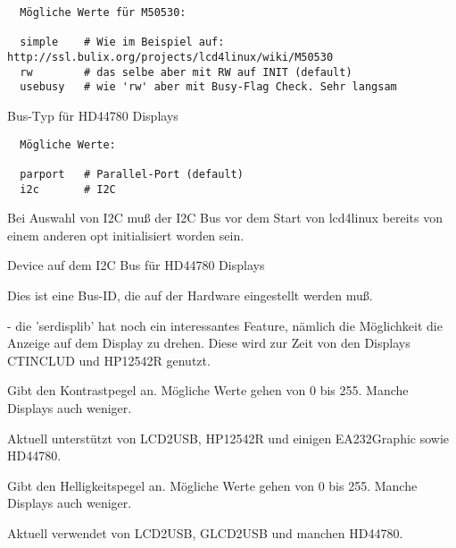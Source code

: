 \begin{description}
\begin{example}
\begin{verbatim}
  Mögliche Werte für M50530:

  simple	# Wie im Beispiel auf: http://ssl.bulix.org/projects/lcd4linux/wiki/M50530
  rw		# das selbe aber mit RW auf INIT (default)
  usebusy	# wie 'rw' aber mit Busy-Flag Check. Sehr langsam
\end{verbatim}
\end{example}


  Bus-Typ für HD44780 Displays
  
\begin{example}
\begin{verbatim}
  Mögliche Werte:

  parport	# Parallel-Port (default)
  i2c		# I2C
\end{verbatim}
\end{example}

  Bei Auswahl von I2C muß der I2C Bus vor dem Start von lcd4linux bereits von einem anderen opt initialisiert worden sein.


  Device auf dem I2C Bus für HD44780 Displays

  Dies ist eine Bus-ID, die auf der Hardware eingestellt werden muß.


  - die 'serdisplib' hat noch ein interessantes Feature, nämlich die Möglichkeit
  die Anzeige auf dem Display zu drehen.
  Diese wird zur Zeit von den Displays CTINCLUD und HP12542R genutzt.


  Gibt den Kontrastpegel an. Mögliche Werte gehen von 0 bis 255. Manche Displays auch weniger.

  Aktuell unterstützt von LCD2USB, HP12542R und einigen EA232Graphic sowie HD44780.


  Gibt den Helligkeitspegel an. Mögliche Werte gehen von 0 bis 255. Manche Displays auch weniger.

  Aktuell verwendet von LCD2USB, GLCD2USB und manchen HD44780.


\end{description}
